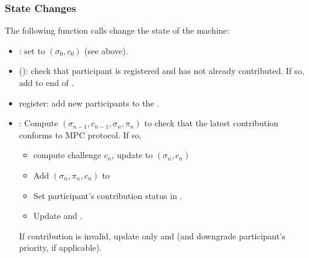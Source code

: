 \subsubsection*{State Changes}
The following function calls change the state of the machine:
\begin{itemize}
    \item \initialize{}: set \MpcState{} to $(\sigma_0, c_0)$ (see above).
    \item \enqueue{}(\ParticipantId{}): check that participant is registered and has not already contributed. If so, add to end of \Queue{}.
    \item \textsf{register}: add new participants to the \Registry{}.
    \item \update{}: Compute \verify{}$(\sigma_{n-1}, c_{n-1}, \sigma_n, \pi_n)$ to check that the latest contribution conforms to MPC protocol. If so, 
        \begin{itemize}
            \item compute challenge $c_n$, update \MpcState{} to $(\sigma_n, c_n)$
            \item Add $(\sigma_n, \pi_n, c_n)$ to \Transcript{}
            \item Set participant's contribution status in \Registry. 
            \item Update \Queue{} and \TimedLock{}.
        \end{itemize}
        If contribution is invalid, update only \Queue{} and \TimedLock{} (and downgrade participant's \Queue{} priority, if applicable).
\end{itemize}


